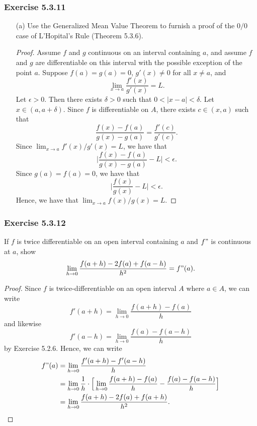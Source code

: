 \subsubsection{Exercise 5.3.11} 
\begin{enumerate}
    \item[(a)] Use the Generalized Mean Value Theorem to furnish a proof of the \( 0/0  \) case of L'Hopital's Rule (Theorem 5.3.6).
        \begin{proof}
        Assume \( f  \) and \( g  \) continuous on an interval containing \( a  \), and assume \( f  \) and \( g  \) are differentiable on this interval with the possible exception of the point \( a  \). Suppose \( f(a) = g(a) = 0  \), \( g'(x) \neq 0 \) for all \( x \neq a  \), and 
        \[  \lim_{ x \to a } \frac{ f'(x)  }{ g'(x) } = L. \]
        Let \( \epsilon > 0  \). Then there exists \( \delta > 0  \) such that \( 0 < | x - a  | < \delta  \). Let \( x \in (a, a + \delta ) \). Since \( f  \) is differentiable on \( A  \), there exists \( c \in (x,a)  \) such that  
        \[  \frac{ f(x) - f(a)  }{ g(x) - g(a)  } = \frac{ f'(c)  }{ g'(c) }.  \]
    Since \( \lim_{ x \to a } f'(x) / g'(x) = L  \), we have that
    \[  \Big|  \frac{ f(x) - f(a)  }{ g(x) - g(a)   } - L \Big| < \epsilon.  \]
    Since \( g(a) = f(a) = 0 \), we have that 
    \[ \Big|  \frac{ f(x)  }{ g(x)  } - L \Big|  < \epsilon.  \]
    Hence, we have that \( \lim_{ x \to a } f(x) / g(x) = L  \).
        \end{proof}
\end{enumerate}





\subsubsection{Exercise 5.3.12} If \( f  \) is twice differentiable on an open interval containing \( a  \) and \( f" \) is continuous at \( a  \), show 
\[  \lim_{ h \to 0 }  \frac{ f(a+h) - 2f(a) + f(a-h)  }{ h^2  } = f"(a). \]
\begin{proof}
    Since \( f  \) is twice-differentiable on an open interval \( A  \) where \( a \in A  \), we can write
\[  f'(a+h) = \lim_{ h \to 0 } \frac{ f(a+h) - f(a)  }{ h  }  \]
and likewise
\[  f'(a-h) = \lim_{ h \to 0  } \frac{ f(a) - f(a-h)   }{ h }  \]
by Exercise 5.2.6. Hence, we can write 
\begin{align*}
    f"(a) &= \lim_{ h \to 0  } \frac{ f'(a+h) - f'(a-h)  }{ h  }  \\
          &= \lim_{ h \to 0  } \frac{ 1 }{ h } \cdot \Big[ \lim_{ h \to 0  }  \frac{ f(a+h) - f(a)  }{ h  } - \frac{ f(a) - f(a-h ) }{ h  }   \Big] \\
          &= \lim_{ h \to 0  } \frac{ f(a + h) - 2f(a) + f(a+h)  }{ h^2 }. 
\end{align*}
\end{proof}

